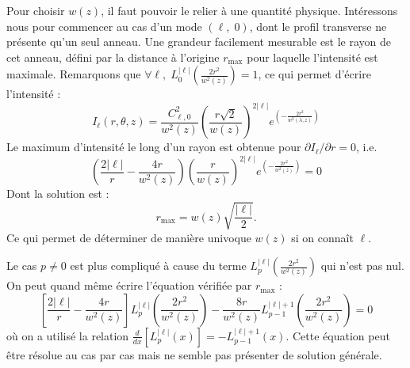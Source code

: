 Pour choisir $w(z)$, il faut pouvoir le relier à une quantité physique. Intéressons nous pour commencer au cas d'un mode $(\ell,\;0)$, dont le profil transverse ne présente qu'un seul anneau. Une grandeur facilement mesurable est le rayon de cet anneau, défini par la distance à l'origine $r_\mathrm{max}$ pour laquelle l'intensité est maximale. Remarquons que $\forall\ell, \;L_0^{\left| \ell  \right|}\left(\frac{2r^2}{w^2(z)}\right) = 1$, ce qui permet d'écrire l'intensité :
\begin{equation}
{I_\ell }(r,\theta ,z) = \frac{C_{\ell,0}^2}{{{w}^2\left( {z} \right)}}{\left( {\frac{r\sqrt{2}}{{w\left( z \right)}}} \right)^{2\left| \ell  \right|}}{e^{\left( { - \frac{{2{r^2}}}{{{w^2}\left( {\lambda ,z} \right)}}} \right)}}
\end{equation}
Le maximum d'intensité le long d'un rayon est obtenue pour $\partial {I_\ell }/\partial r = 0$, i.e. 
\begin{equation}
	\left( {\frac{{2\left| \ell  \right|}}{r} - \frac{{4r}}{{{w^2}\left( z \right)}}} \right){\left( {\frac{r}{{w\left( z \right)}}} \right)^{2\left| \ell  \right|}}{e^{\left( { - \frac{{2{r^2}}}{{{w^2}\left( z \right)}}} \right)}} = 0
\end{equation}
Dont la solution est :
\begin{equation}
{r_{{\mathrm{max}}}} = w\left( {z} \right)\sqrt {\frac{{\left| \ell  \right|}}{2}}.
\label{Eq:rmax_LG}
\end{equation}
Ce qui permet de déterminer de manière univoque $w(z)$ si on connaît $\ell$.

Le cas $p\neq 0$ est plus compliqué à cause du terme $L_p^{\left| \ell  \right|}\left(\frac{2r^2}{w^2(z)}\right)$ qui n'est pas nul. On peut quand même écrire l'équation vérifiée par $r_\mathrm{max}$ :
\begin{equation}
 \left[{\frac{{2\left| \ell  \right|}}{r} - \frac{{4r}}{{{w^2}\left( z \right)}}}\right]L_p^{\left| \ell  \right|}\left(\frac{2r^2}{w^2(z)}\right)
	- \frac{8r}{w^2(z)} L_{p-1}^{\left| \ell \right|+1}\left(\frac{2r^2}{w^2(z)}\right)
	= 0
\end{equation}
où on a utilisé la relation $\frac{d}{dx}\left[L_{p}^{\left| \ell \right|}(x)\right] = -L_{p-1}^{\left| \ell \right|+1}(x)$. Cette équation peut être résolue au cas par cas mais ne semble pas présenter de solution générale.

